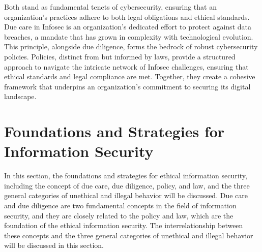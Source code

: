 \documentclass[
10pt, %
a4paper, %
oneside, %
headinclude,footinclude, %
BCOR5mm, %
]{scrartcl}
\begin{document}
Both stand as fundamental tenets of cybersecurity, ensuring that an organization's practices adhere to both legal obligations and ethical standards.
Due care in Infosec is an organization's dedicated effort to protect against data breaches, a mandate that has grown in complexity with technological evolution. 
This principle, alongside due diligence, forms the bedrock of robust cybersecurity policies. 
Policies, distinct from but informed by laws, provide a structured approach to navigate the intricate network of Infosec challenges, ensuring that ethical standards and legal compliance are met.
Together, they create a cohesive framework that underpins an organization's commitment to securing its digital landscape.
\section{Foundations and Strategies for Information Security}
In this section, the foundations and strategies for ethical information security, including the concept of due care, due diligence, policy, and law, and the three general categories of unethical and illegal behavior will be discussed.
Due care and due diligence are two fundamental concepts in the field of information security, and they are closely related to the policy and law, which are the foundation of the ethical information security.
The interrelationship between these concepts and the three general categories of unethical and illegal behavior will be discussed in this section.
\end{document}

